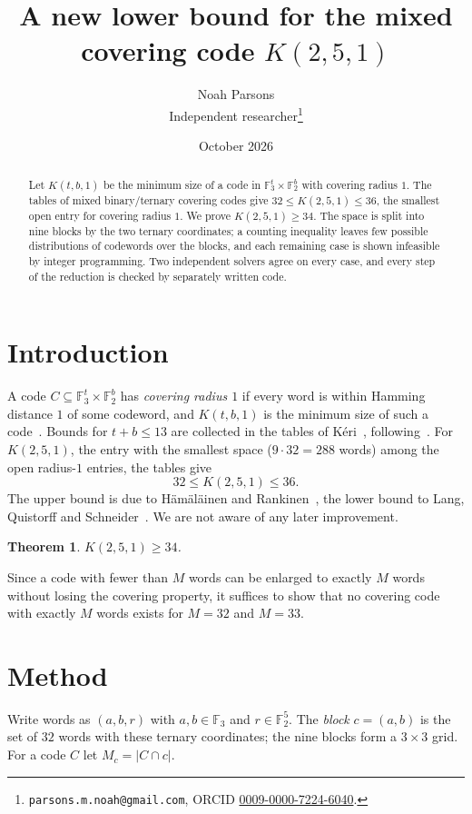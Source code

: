 \documentclass[11pt]{article}
\title{A new lower bound for the mixed covering code $K(2,5,1)$}
\author{Noah Parsons\\ \small Independent researcher\thanks{%
\texttt{parsons.m.noah@gmail.com}, ORCID \href{https://orcid.org/0009-0000-7224-6040}{0009-0000-7224-6040}.}}
\date{October 2026}
\newtheorem{theorem}{Theorem}
\theoremstyle{remark}
\newcommand{\F}{\mathbb{F}}
\newcommand{\newbound}{34}
\newcommand{\lastM}{33}
\begin{document}
\maketitle

\begin{abstract}
Let $K(t,b,1)$ be the minimum size of a code in $\F_3^t\times\F_2^b$ with covering radius $1$.
The tables of mixed binary/ternary covering codes give $32\le K(2,5,1)\le 36$, the smallest open
entry for covering radius $1$. We prove $K(2,5,1)\ge\newbound$. The space is split into nine
blocks by the two ternary coordinates; a counting inequality leaves few possible distributions of
codewords over the blocks, and each remaining case is shown infeasible by integer programming.
Two independent solvers agree on every case, and every step of the reduction is checked by
separately written code.
\end{abstract}

\section{Introduction}

A code $C\subseteq\F_3^t\times\F_2^b$ has \emph{covering radius $1$} if every word is within
Hamming distance $1$ of some codeword, and $K(t,b,1)$ is the minimum size of such a
code~\cite{cohen-book}. Bounds for $t+b\le 13$ are collected in the tables of
K\'eri~\cite{keri}, following~\cite{oh,bow}. For $K(2,5,1)$, the entry with the smallest space
($9\cdot 32=288$ words) among the open radius-$1$ entries, the tables give
\[
32\le K(2,5,1)\le 36 .
\]
The upper bound is due to Hämäläinen and Rankinen~\cite{hr}, the lower bound to Lang, Quistorff
and Schneider~\cite{lqs}. We are not aware of any later improvement.

\begin{theorem}\label{thm:main}
$K(2,5,1)\ge\newbound$.
\end{theorem}

Since a code with fewer than $M$ words can be enlarged to exactly $M$ words without losing the
covering property, it suffices to show that no covering code with exactly $M$ words exists for
$M=32$ and $M=\lastM$.

\section{Method}

Write words as $(a,b,r)$ with $a,b\in\F_3$ and $r\in\F_2^5$. The \emph{block} $c=(a,b)$ is the
set of $32$ words with these ternary coordinates; the nine blocks form a $3\times 3$ grid. For a
code $C$ let $M_c=|C\cap c|$.
\end{document}
